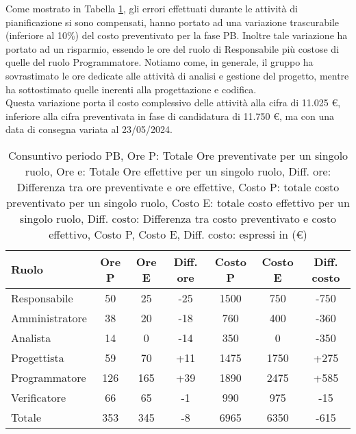 Come mostrato in Tabella \ref{t:differenza}, gli errori effettuati durante le attività di pianificazione si sono compensati, hanno portato ad una variazione trascurabile (inferiore al 10\%) del costo preventivato per la fase PB.
Inoltre tale variazione ha portato ad un risparmio, essendo le ore del ruolo di Responsabile più costose di quelle del ruolo Programmatore.
Notiamo come, in generale, il gruppo ha sovrastimato le ore dedicate alle attività di analisi e gestione del progetto, mentre ha sottostimato quelle inerenti alla progettazione e codifica. \\
Questa variazione porta il costo complessivo delle attività alla cifra di 11.025 \euro, inferiore alla cifra preventivata in fase di candidatura di 11.750 \euro, ma con una data di consegna variata al 23/05/2024.

\begin{table}[H]
	\centering
	\begin{tabular}{l|c|c|c|c|c|c}
		\textbf{Ruolo} & \textbf{Ore P} & \textbf{Ore E} & \textbf{Diff. ore} & \textbf{Costo P} & \textbf{Costo E} & \textbf{Diff. costo} \\
		\hline
		Responsabile   & 50             & 25             & -25                & 1500             & 750              & -750                 \\
		Amministratore & 38             & 20             & -18                & 760              & 400              & -360                 \\
		Analista       & 14             & 0              & -14                & 350              & 0                & -350                 \\
		Progettista    & 59             & 70             & +11                & 1475             & 1750             & +275                 \\
		Programmatore  & 126            & 165            & +39                & 1890             & 2475             & +585                 \\
		Verificatore   & 66             & 65             & -1                 & 990              & 975              & -15                  \\
		\hline
		Totale         & 353            & 345            & -8                 & 6965             & 6350             & -615                 \\
		\hline
	\end{tabular}
	\caption{Consuntivo periodo PB, Ore P: Totale Ore preventivate per un singolo ruolo, Ore e: Totale Ore effettive per un singolo ruolo,
		Diff. ore: Differenza tra ore preventivate e ore effettive, Costo P: totale costo preventivato per un singolo ruolo,
		Costo E: totale costo effettivo per un singolo ruolo,  Diff. costo: Differenza tra costo preventivato e costo effettivo,
		Costo P, Costo E, Diff. costo: espressi in (\euro)}
	\label{t:differenza}
\end{table}
